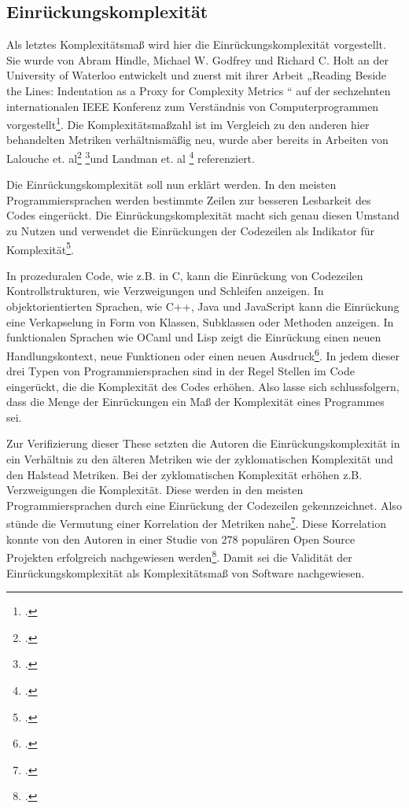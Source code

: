 \subsection{Einrückungskomplexität}\label{Einruckungskomplexitat}

Als letztes Komplexitätsmaß wird hier die Einrückungskomplexität
vorgestellt. Sie wurde von Abram Hindle, Michael W. Godfrey und Richard
C. Holt an der University of Waterloo entwickelt und zuerst mit ihrer
Arbeit „Reading Beside the Lines: Indentation as a Proxy for Complexity
Metrics `` auf der sechzehnten internationalen IEEE Konferenz zum
Verständnis von Computerprogrammen vorgestellt\footcite[Vgl. ][]{hindleReadingLinesIndentation2008
  S. 1}. Die Komplexitätsmaßzahl ist im Vergleich zu den anderen hier
behandelten Metriken verhältnismäßig neu, wurde aber bereits in Arbeiten
von Lalouche et. al\footcite[Vgl. ][]{gilWhenSoftwareComplexity2016 S. 10}
\footcite[Vgl. ][]{gilCorrelationSizeMetric2017 S. 7}und Landman et. al
\footcite[Vgl. ][]{landmanEmpiricalAnalysisRelationship2016 S. 6} referenziert.

Die Einrückungskomplexität soll nun erklärt werden. In den meisten
Programmiersprachen werden bestimmte Zeilen zur besseren Lesbarkeit des
Codes eingerückt. Die Einrückungskomplexität macht sich genau diesen
Umstand zu Nutzen und verwendet die Einrückungen der Codezeilen als
Indikator für Komplexität\footcite[Vgl. ][]{hindleReadingLinesUsing2009 S. 1}.

In prozeduralen Code, wie z.B. in C, kann die Einrückung von Codezeilen
Kontrollstrukturen, wie Verzweigungen und Schleifen anzeigen. In
objektorientierten Sprachen, wie C++, Java und JavaScript kann die
Einrückung eine Verkapselung in Form von Klassen, Subklassen oder
Methoden anzeigen. In funktionalen Sprachen wie OCaml und Lisp zeigt die
Einrückung einen neuen Handlungskontext, neue Funktionen oder einen
neuen Ausdruck\footcite[Vgl. ][]{}. In jedem dieser drei Typen von
Programmiersprachen sind in der Regel Stellen im Code eingerückt, die
die Komplexität des Codes erhöhen. Also lasse sich schlussfolgern, dass
die Menge der Einrückungen ein Maß der Komplexität eines Programmes sei.

Zur Verifizierung dieser These setzten die Autoren die
Einrückungskomplexität in ein Verhältnis zu den älteren Metriken wie der
zyklomatischen Komplexität und den Halstead Metriken. Bei der
zyklomatischen Komplexität erhöhen z.B. Verzweigungen die Komplexität.
Diese werden in den meisten Programmiersprachen durch eine Einrückung
der Codezeilen gekennzeichnet. Also stünde die Vermutung einer
Korrelation der Metriken nahe\footcite[Vgl. ][]{hindleReadingLinesUsing2009 S. 2}.
Diese Korrelation konnte von den Autoren in einer Studie von 278
populären Open Source Projekten erfolgreich nachgewiesen
werden\footcite[Vgl. ][]{Quelle}. Damit sei die Validität der
Einrückungskomplexität als Komplexitätsmaß von Software nachgewiesen.


